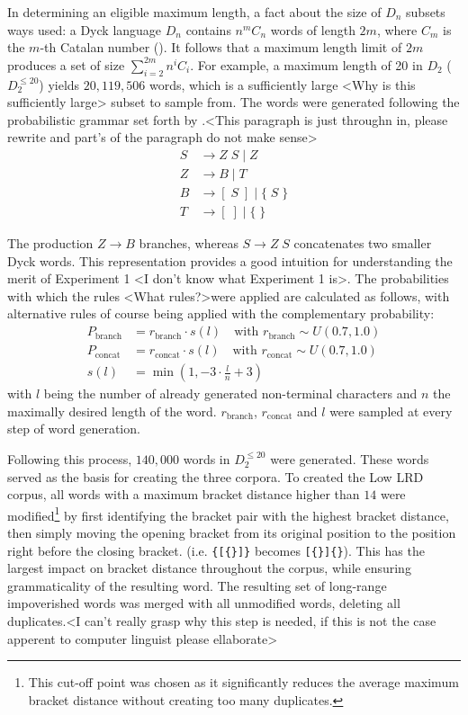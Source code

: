 In determining an eligible maximum length, a fact about the size of $D_{n}$ subsets ways used: a Dyck language $D_{n}$ contains $n^mC_{n}$ words of length $2m$, where $C_{m}$ is the $m$-th Catalan number (\cite{Skachkova2018}). It follows that a maximum length limit of $2m$ produces a set of size $\sum_{i=2}^{2m}n^{i}C_{i}$. For example, a maximum length of 20 in $D_{2}$ ($D_{2}^{\leq 20}$) yields $20,119,506$ words, which is a sufficiently large <Why is this sufficiently large> subset to sample from. The words were generated following the probabilistic grammar set forth by \cite{Sennhauser2018}.<This paragraph is just throughn in, please rewrite and part's of the paragraph do not make sense>
\begin{align*}
	S &\rightarrow Z \; S \; \vert \; Z \\
	Z &\rightarrow B \; \vert \; T \\
	B &\rightarrow [ \; S \; ] \; \vert \; \lbrace \; S \; \rbrace \\
	T &\rightarrow [ \; ] \; \vert \; \lbrace \; \rbrace
\end{align*}

The production $Z \rightarrow B$ branches, whereas $S \rightarrow Z \; S$ concatenates two smaller Dyck words. This representation provides a good intuition for understanding the merit of Experiment 1 <I don't know what Experiment 1 is>. The probabilities with which the rules <What rules?>were applied are calculated as follows, with alternative rules of course being applied with the complementary probability:
\begin{align*}
	P_{\text{branch}} &= r_{\text{branch}} \cdot s(l) \quad \text{with } r_{\text{branch}} \sim U(0.7,1.0) \\
	P_{\text{concat}} &= r_{\text{concat}} \cdot s(l) \quad \text{with } r_{\text{concat}} \sim U(0.7,1.0) \\
	s(l) &= \min(1, -3 \cdot \frac{l}{n} + 3)
\end{align*}
with $l$ being the number of already generated non-terminal characters and $n$ the maximally desired length of the word. $r_{\text{branch}}$, $r_{\text{concat}}$ and $l$ were sampled at every step of word generation.

Following this process, $140,000$ words in $D_{2}^{\leq 20}$ were generated. These words served as the basis for creating the three corpora. To created the Low LRD corpus, all words with a maximum bracket distance higher than $14$ were modified\footnote{This cut-off point was chosen as it significantly reduces the average maximum bracket distance without creating too many duplicates.} by first identifying the bracket pair with the highest bracket distance, then simply moving the opening bracket from its original position to the position right before the closing bracket. (i.e. \texttt{\{[\{\}]\}} becomes \texttt{[\{\}]\{\}}). This has the largest impact on bracket distance throughout the corpus, while ensuring grammaticality of the resulting word. The resulting set of long-range impoverished words was merged with all unmodified words, deleting all duplicates.<I can't really grasp why this step is needed, if this is not the case apperent to computer linguist please ellaborate>

